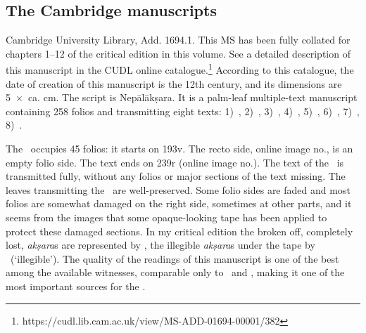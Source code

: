 


\medskip
\label{mss_descr}
\subsection{The Cambridge manuscripts}

Cambridge University Library, Add. 1694.1. This MS has been 
fully collated for chapters 1--12 of the critical edition in this volume. 
See a detailed description of this manuscript in the 
CUDL online catalogue.\footnote{https://cudl.lib.cam.ac.uk/view/MS-ADD-01694-00001/382}
According to this catalogue, the date of creation of this manuscript 
is the 12th century, and its dimensions are 5~×~ca. cm. 
The script is Nepālākṣara. It is a palm-leaf multiple-text manuscript containing 258
folios and transmitting eight texts: 
1)~\SDhS,
2)~\SDhU,
3)~\SDhSangr,
4)~\Ums,
5)~\Uums, 
6)~\Vss,
7)~\DharmP,
8)~\SivaUp.

The \VSS\ occupies 45 folios: it starts on \fol193v. 
The recto side, online image no., is an empty folio side. 
The text ends on \fol239r (online image no.). 
The text of the \VSS\ is transmitted fully,
without any folios or major sections of the text missing. The leaves
transmitting the \VSS\ are well-preserved. Some folio sides are faded and
most folios are somewhat damaged on the right side, 
sometimes at other parts, and it seems from the images 
that some opaque-looking tape has been applied to protect these damaged sections. 
In my critical edition the broken off, completely lost, 
\emph{akṣara}s are represented by \lac,
the illegible \emph{akṣara}s under the tape by \lk\ (`illegible'). The
quality of the readings of this manuscript is one of the best among
the available witnesses, comparable only to \msNa\ and \msParis, 
making it one of the most important sources for the \VSS.


